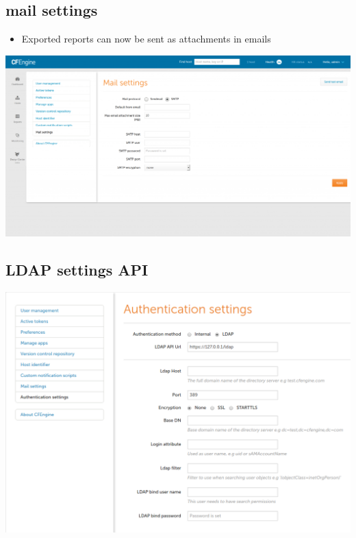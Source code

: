 \documentclass[11pt]{article}
\begin{document}
\subsection*{mail settings}
\label{sec:org3486fbf}
\begin{itemize}
\item Exported reports can now be sent as attachments in emails
\end{itemize}

\begin{center}
\includegraphics[width=.9\linewidth]{data/74/8d9e15-278e-46ac-822f-9e0f7e6b2830/mail-settings-1024x537_2018-01-14_12-01-05.png}
\end{center}

\subsection*{LDAP settings API}
\label{sec:orgaa99384}
\begin{center}
\includegraphics[width=.9\linewidth]{data/29/4c1258-49f4-4c72-9f8d-2b7535cfbea8/Authentication-settings_2018-01-14_12-04-18.png}
\end{center}
\end{document}
